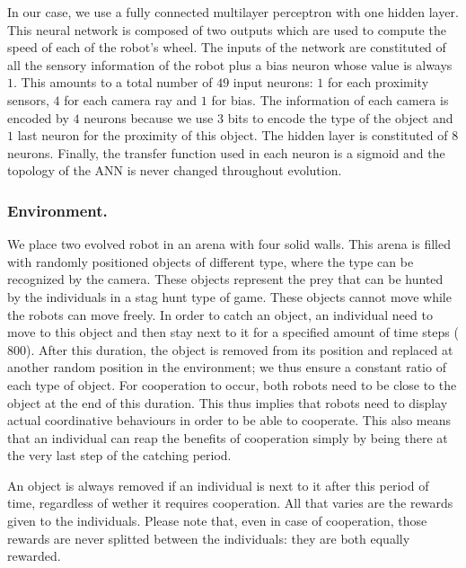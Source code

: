     In our case, we use a fully connected multilayer perceptron with one hidden layer. This neural network is composed of two outputs which are used to compute the speed of each of the robot's wheel. The inputs of the network are constituted of all the sensory information of the robot plus a bias neuron whose value is always $1$. This amounts to a total number of $49$ input neurons: $1$ for each proximity sensors, $4$ for each camera ray and $1$ for bias. The information of each camera is encoded by $4$ neurons because we use $3$ bits to encode the type of the object and $1$ last neuron for the proximity of this object. The hidden layer is constituted of $8$ neurons. Finally, the transfer function used in each neuron is a sigmoid and the topology of the ANN is never changed throughout evolution.

    \subsubsection{Environment.} We place two evolved robot in an arena with four solid walls. This arena is filled with randomly positioned objects of different type, where the type can be recognized by the camera. These objects represent the prey that can be hunted by the individuals in a stag hunt type of game. These objects cannot move while the robots can move freely. In order to catch an object, an individual need to move to this object and then stay next to it for a specified amount of time steps ($800$). After this duration, the object is removed from its position and replaced at another random position in the environment; we thus ensure a constant ratio of each type of object. For cooperation to occur, both robots need to be close to the object at the end of this duration. This thus implies that robots need to display actual coordinative behaviours in order to be able to cooperate. This also means that an individual can reap the benefits of cooperation simply by being there at the very last step of the catching period.

    An object is always removed if an individual is next to it after this period of time, regardless of wether it requires cooperation. All that varies are the rewards given to the individuals. Please note that, even in case of cooperation, those rewards are never splitted between the individuals: they are both equally rewarded.

